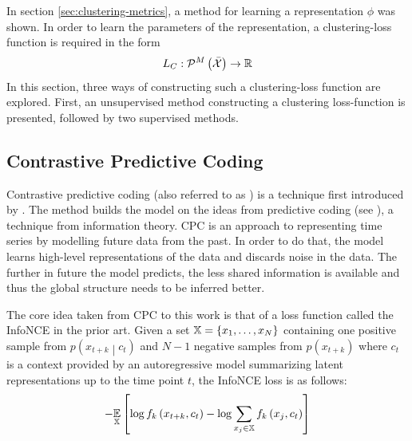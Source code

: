 In section \ref{sec:clustering-metrics}, a method for learning a representation \( \phi \) was shown. In order to learn the parameters of the representation, a clustering-loss function is required in the form
\[ L_C : \mathcal{P}^M \left( \bar{\mathcal{X}} \right) \to \mathbb{R} \]
In this section, three ways of constructing such a clustering-loss function are explored. First, an unsupervised method constructing a clustering loss-function is presented, followed by two supervised methods.


\subsection{Contrastive Predictive Coding}
Contrastive predictive coding (also referred to as ) is a technique first introduced by \cite{oord_representation_2019}. The method builds the model on the ideas from predictive coding (see \cite{elias_predictive_1955}), a technique from information theory. CPC is an approach to representing time series by modelling future data from the past. In order to do that, the model learns high-level representations of the data and discards noise in the data. The further in future the model predicts, the less shared information is available and thus the global structure needs to be inferred better.

The core idea taken from CPC to this work is that of a loss function called the InfoNCE in the prior art. Given a set \( \mathbb{X} = \left\{ x_1, \dots, x_N \right\} \) containing one positive sample from \( p \left( x_{t + k} \middle| c_t \right) \) and \( N - 1 \) negative samples from \( p \left( x_{t + k} \right) \) where \( c_t \) is a context provided by an autoregressive model summarizing latent representations up to the time point \( t \), the InfoNCE loss is as follows:
\[ - \underset{\mathbb{X}}{\mathbb{E}} \left[ \log f_k \left( x_{t + k}, c_t \right) - \log \sum_{x_j \in \mathbb{X}} f_k \left( x_j, c_t \right) \right] \]


